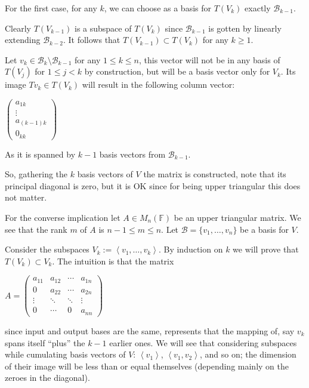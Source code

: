 \documentclass{article}
\theoremstyle{remark}
\begin{document}
\begin{enumerate}
        For the first case, for any $k$, we can choose as a basis for $T(V_k)$ exactly $\mathcal{B}_{k-1}$.

        Clearly $T(V_{k-1})$ is a subspace of $T(V_k)$ since $\mathcal{B}_{k-1}$ is gotten by linearly extending $\mathcal{B}_{k-2}$.
        It follows that $T(V_{k-1}) \subset T(V_{k})$ for any $k \geq 1$.
        
        Let $v_k \in \mathcal{B}_k \setminus \mathcal{B}_{k-1}$ for any $1 \leq k \leq n$, this vector will not be in any basis of $T(V_j)$ for $1 \leq j < k$ by construction, but will be a basis vector only for $V_k$.
        Its image $Tv_k \in T(V_k)$ will result in the following column vector:
        \begin{center}
            $\begin{pmatrix}
                a_{1k} \\
                \vdots \\
                a_{(k-1)k} \\
                0_{kk}
            \end{pmatrix}$
        \end{center}
        As it is spanned by $k-1$ basis vectors from $\mathcal{B}_{k-1}$.

        So, gathering the $k$ basis vectors of $V$ the matrix is constructed, note that its principal diagonal is zero, but it is OK since for being
        upper triangular this does not matter.

        For the converse implication let $A \in M_{n}(\mathbb{F})$ be an upper triangular matrix.
        We see that the rank $m$ of $A$ is $n-1 \leq m \leq n$. Let $\mathcal{B} = \{v_1, \dots, v_n\}$ be a basis for $V$.
        
        Consider the subspaces $V_k := \left\langle v_1, \dots, v_k\right\rangle $. By induction on $k$ we will prove 
        that $T(V_k) \subset V_k$.
        The intuition is that the matrix 
        \begin{center}
            $A = \begin{pmatrix}
                a_{11} & a_{12} & \cdots & a_{1n} \\
                0       & a_{22} & \cdots & a_{2n} \\
                \vdots & \ddots & \ddots & \vdots \\
                0 & \cdots & 0 & a_{nn}
            \end{pmatrix}$
        \end{center}
        since input and output bases are the same, represents that the mapping of, say $v_k$ spans itself ``plus'' the $k-1$ earlier ones.
        We will see that considering subspaces while cumulating basis vectors of $V$: $\left\langle v_1\right\rangle$, $\left\langle v_1, v_2\right\rangle$, and so on;
        the dimension of their image will be less than or equal themselves (depending mainly on the zeroes in the diagonal). 


\end{enumerate}
\end{document}
